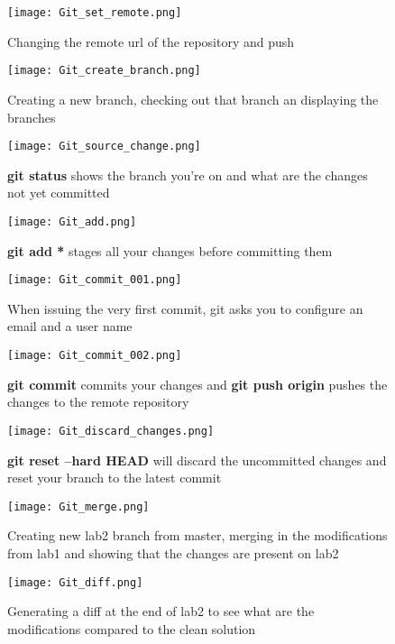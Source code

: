 \begin{appendices}
\begin{figure}[htb]
	\centering
	\texttt{[image: Git\_set\_remote.png]}
	\caption{Changing the remote url of the repository and push}
\end{figure}

\begin{figure}[htb]
	\centering
	\texttt{[image: Git\_create\_branch.png]}
	\caption{Creating a new branch, checking out that branch an displaying the branches}
\end{figure}

\begin{figure}[htb]
	\centering
	\texttt{[image: Git\_source\_change.png]}
	\caption{\textbf{git status} shows the branch you're on and what are the changes not yet committed}
\end{figure}

\begin{figure}[htb]
	\centering
	\texttt{[image: Git\_add.png]}
	\caption{\textbf{git add *} stages all your changes before committing them}
\end{figure}

\begin{figure}[htb]
	\centering
	\texttt{[image: Git\_commit\_001.png]}
	\caption{When issuing the very first commit, git asks you to configure an email and a user name}
\end{figure}

\begin{figure}[htb]
	\centering
	\texttt{[image: Git\_commit\_002.png]}
	\caption{\textbf{git commit} commits your changes and \textbf{git push origin} pushes the changes to the remote repository}
\end{figure}

\begin{figure}[htb]
	\centering
	\texttt{[image: Git\_discard\_changes.png]}
	\caption{\textbf{git reset --hard HEAD} will discard the uncommitted changes and reset your branch to the latest commit}
\end{figure}

\begin{figure}[htb]
	\centering
	\texttt{[image: Git\_merge.png]}
	\caption{Creating new lab2 branch from master, merging in the modifications from lab1 and showing that the changes are present on lab2}
\end{figure}

\begin{figure}[htb]
	\centering
	\texttt{[image: Git\_diff.png]}
	\caption{Generating a diff at the end of lab2 to see what are the modifications compared to the clean solution}
\end{figure}


\end{appendices}
